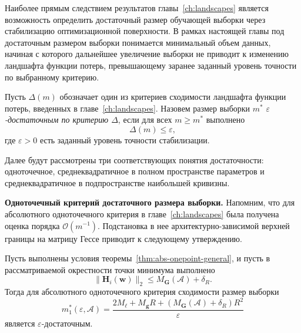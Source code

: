 Наиболее прямым следствием результатов главы~\ref{ch:landscapes} является возможность определить достаточный размер обучающей выборки через стабилизацию оптимизационной поверхности. В рамках настоящей главы под достаточным размером выборки понимается минимальный объем данных, начиная с которого дальнейшее увеличение выборки не приводит к изменению ландшафта функции потерь, превышающему заранее заданный уровень точности по выбранному критерию.

\begin{definition}
    \label{def:scaling-sufficient}
    Пусть $\Delta(m)$ обозначает один из критериев сходимости ландшафта функции потерь, введенных в главе~\ref{ch:landscapes}. Назовем размер выборки $m^*$ \emph{$\varepsilon$-достаточным по критерию $\Delta$}, если для всех $m \geq m^*$ выполнено
    \begin{equation}
        \Delta(m)\le \varepsilon,
    \end{equation}
    где $\varepsilon>0$ есть заданный уровень точности стабилизации.
\end{definition}

Далее будут рассмотрены три соответствующих понятия достаточности: одноточечное, среднеквадратичное в полном пространстве параметров и среднеквадратичное в подпространстве наибольшей кривизны.

\textbf{Одноточечный критерий достаточного размера выборки.} Напомним, что для абсолютного одноточечного критерия в главе~\ref{ch:landscapes} была получена оценка порядка $\mathcal O(m^{-1})$. Подстановка в нее архитектурно-зависимой верхней границы на матрицу Гессе приводит к следующему утверждению.

\begin{theorem}
    \label{thm:scaling-sufficient-onepoint}
    Пусть выполнены условия теоремы~\ref{thm:abs-onepoint-general}, и пусть в рассматриваемой окрестности точки минимума выполнено
    \begin{equation}
        \|\mathbf H_i(\mathbf w)\|_2
        \le
        M_{\mathbf G}(\mathcal A)+\delta_R.
    \end{equation}
    Тогда для абсолютного одноточечного критерия сходимости размер выборки
    \begin{equation}
        \label{eq:scaling-m1}
        m_1^*(\varepsilon, \mathcal A)
        =
        \frac{
            2M_{\ell}
            +
            M_{\mathbf g}R
            +
            \left(M_{\mathbf G}(\mathcal A)+\delta_R\right)R^2
        }{\varepsilon}
    \end{equation}
    является $\varepsilon$-достаточным.
\end{theorem}

